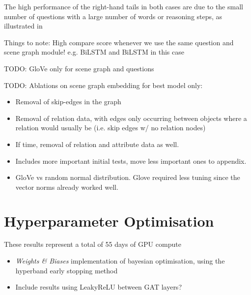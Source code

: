 The high performance of the right-hand tails in both cases are due to the small number of questions with a large number of words or reasoning steps, as illustrated in \figureautorefname{ \ref{fig:test_reasoning_step_and_question_length_distribution}}


{\color{red}Things to note: High compare score whenever we use the same question and scene graph module! e.g. BiLSTM and BiLSTM in this case}

{\color{red}TODO: GloVe only for scene graph and questions}

{\color{red}TODO: Ablations on scene graph embedding for best model only:
\begin{itemize}
    \item Removal of skip-edges in the graph
    \item Removal of relation data, with edges only occurring between objects where a relation would usually be (i.e. skip edges w/ no relation nodes)
    \item If time, removal of relation and attribute data as well.
\end{itemize}}

\begin{itemize}
    \item Includes more important initial tests, move less important ones to appendix.
\end{itemize}

\begin{itemize}
    \item GloVe vs random normal distribution. Glove required less tuning since the vector norms already worked well.
\end{itemize}

\section{Hyperparameter Optimisation}
\label{sec:hyperparameter_optimisation}

These results represent a total of 55 days of GPU compute

{\color{red}
  \begin{itemize}
    \item \textit{Weights \& Biases} \cite{wandb} implementation of bayesian optimisation, using the hyperband early stopping method
    \item Include results using LeakyReLU between GAT layers?
  \end{itemize}
}



